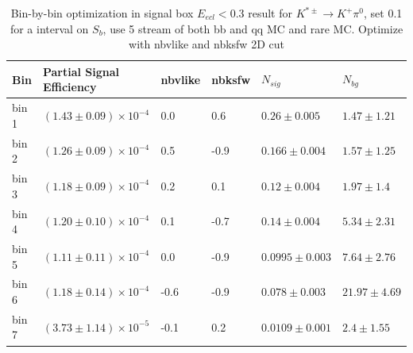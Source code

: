 \begin{table}[h]
\small
\begin{center}
\begin{tabular}{ |p{0.8cm}||p{3.7cm}||p{1.2cm}||p{1.2cm}||p{2.6cm}||p{2.7cm}| }
  \hline
 Bin & Partial Signal Efficiency & nbvlike & nbksfw & $N_{sig}$ & $N_{bg}$  \\
 \hline
 bin 1  & $(1.43 \pm 0.09) \times 10^{-4}$ &0.0&0.6&$0.26\pm 0.005 $  &$1.47\pm 1.21 $\\ %
 \hline
 bin 2  & $(1.26 \pm 0.09)\times 10^{-4}$ &0.5& -0.9&$0.166 \pm 0.004 $&$1.57\pm 1.25 $\\ %
 \hline
 bin 3  & $(1.18 \pm 0.09)\times 10^{-4}$ &0.2&0.1&$0.12 \pm 0.004 $&$1.97\pm 1.4 $\\ %
 \hline
 bin 4  & $(1.20 \pm 0.10)\times 10^{-4}$ &0.1&-0.7&$0.14 \pm 0.004 $&$5.34\pm 2.31 $ \\ %
 \hline
 bin 5  & $(1.11\pm 0.11) \times 10^{-4}$ &0.0& -0.9&$0.0995 \pm 0.003 $&$7.64\pm 2.76 $ \\ %
 \hline
 bin 6  & $(1.18\pm 0.14) \times 10^{-4}$ &-0.6& -0.9&$0.078\pm 0.003 $&$21.97 \pm 4.69 $\\ %
 \hline
 bin 7  & $(3.73 \pm 1.14)\times 10^{-5}$ &-0.1&0.2&$0.0109 \pm 0.001 $&$ 2.4\pm 1.55 $ \\ %
 \hline
 \hline
\end{tabular}

\caption{Bin-by-bin optimization in signal box $E_{ecl} < 0.3$ result for $K^{*\pm} \rightarrow K^{+} \pi^0$, set 0.1 for a interval on $S_b$, use 5 stream of both bb and qq MC and rare MC. Optimize with nbvlike and nbksfw 2D cut } \label{t:optkpi0}
\end{center}
\end{table}

